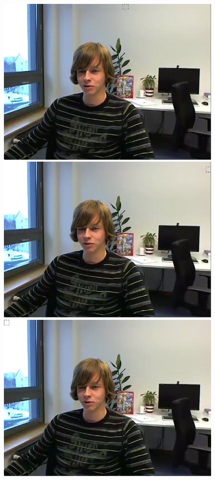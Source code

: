 \documentclass[11pt]{article} %
\begin{document}
\begin{figure}[!h]
    \centering
    \includegraphics[scale=0.43]{QPOffset/trialOffset/Paul250kbps_offset2}
    \includegraphics[scale=0.43]{QPOffset/trialOffset/Paul250kbps_offset4}
    \includegraphics[scale=0.43]{QPOffset/trialOffset/Paul250kbps_offset6}

\end{figure}
\end{document}
